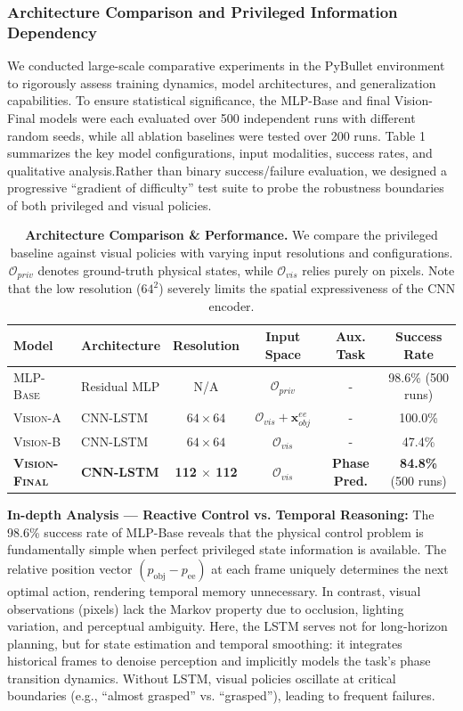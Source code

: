 \documentclass{article} %
\begin{document}
\subsubsection{Architecture Comparison and Privileged Information Dependency}
We conducted large-scale comparative experiments in the PyBullet environment to rigorously assess training dynamics, model architectures, and generalization capabilities. To ensure statistical significance, the MLP-Base and final Vision-Final models were each evaluated over 500 independent runs with different random seeds, while all ablation baselines were tested over 200 runs.
Table 1 summarizes the key model configurations, input modalities, success rates, and qualitative analysis.Rather than binary success/failure evaluation, we designed a progressive “gradient of difficulty” test suite to probe the robustness boundaries of both privileged and visual policies.
\begin{table}[t]
\centering
\caption{{\bfseries Architecture Comparison \& Performance.} We compare the privileged baseline against visual policies with varying input resolutions and configurations. $\mathcal{O}_{priv}$ denotes ground-truth physical states, while $\mathcal{O}_{vis}$ relies purely on pixels. Note that the low resolution ($64^2$) severely limits the spatial expressiveness of the CNN encoder.}
\label{tab:model_comparison}
\begin{tabular}{@{}llcccc@{}}
\toprule
{\bfseries Model} & {\bfseries Architecture} & {\bfseries Resolution} & {\bfseries Input Space} & {\bfseries Aux. Task} & {\bfseries Success Rate} \\ \midrule
\textsc{MLP-Base} & Residual MLP & N/A & $\mathcal{O}_{priv}$ & - & 98.6\% \scriptsize{(500 runs)} \\
\textsc{Vision-A} & CNN-LSTM & $64 \times 64$ & $\mathcal{O}_{vis} + \mathbf{x}_{obj}^{ee}$ & - & 100.0\% \\
\textsc{Vision-B} & CNN-LSTM & $64 \times 64$ & $\mathcal{O}_{vis}$ & - & 47.4\% \\
{\bfseries \textsc{Vision-Final}} & {\bfseries CNN-LSTM} & {\bfseries 112 $\times$ 112} & {\bfseries $\mathcal{O}_{vis}$} & {\bfseries Phase Pred.} & {\bfseries 84.8\%} \scriptsize{(500 runs)} \\ \bottomrule
\end{tabular}
\end{table}

{\bfseries In-depth Analysis — Reactive Control vs. Temporal Reasoning:}  The 98.6\% success rate of MLP-Base reveals that the physical control problem is fundamentally simple when perfect privileged state information is available. The relative position vector $  (p_{\text{obj}} - p_{\text{ee}})  $ at each frame uniquely determines the next optimal action, rendering temporal memory unnecessary.
In contrast, visual observations (pixels) lack the Markov property due to occlusion, lighting variation, and perceptual ambiguity. Here, the LSTM serves not for long-horizon planning, but for state estimation and temporal smoothing: it integrates historical frames to denoise perception and implicitly models the task’s phase transition dynamics. Without LSTM, visual policies oscillate at critical boundaries (e.g., “almost grasped” vs. “grasped”), leading to frequent failures.
\end{document}
